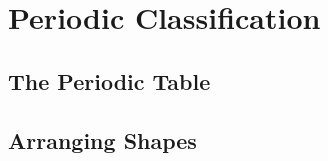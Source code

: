 \section{Periodic Classification}

\begin{multicols}{2}


\section*{The Periodic Table} %


%
%

\subsection{Arranging Shapes}


\end{multicols}
